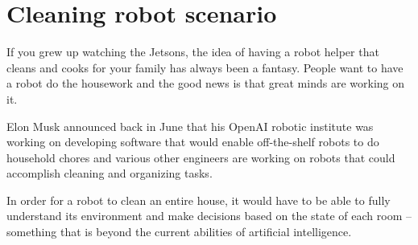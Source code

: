 \chapter{Cleaning robot scenario}

If you grew up watching the Jetsons, the idea of having a robot helper that cleans and cooks for your family has always been a fantasy. People want to have a robot do the housework and the good news is that great minds are working on it.

Elon Musk announced back in June that his OpenAI robotic institute was working on developing software that would enable off-the-shelf robots to do household chores and various other engineers are working on robots that could accomplish cleaning and organizing tasks.

 In order for a robot to clean an entire house, it would have to be able to fully understand its environment and make decisions based on the state of each room -- something that is beyond the current abilities of artificial intelligence. 
 \cite{http://www.treehugger.com/gadgets/want-robot-clean-your-house-youll-have-wait-bit-longer.html}
 